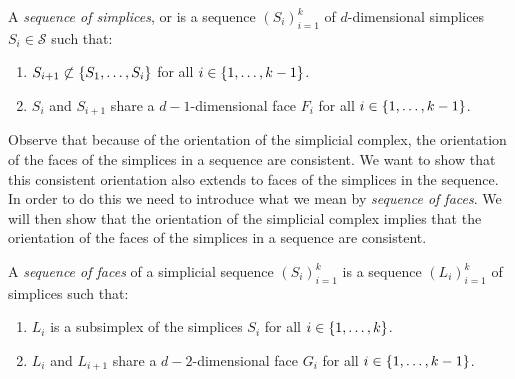 \begin{definition}
    \label{def:sequence_of_simplices}
    A \emph{sequence of simplices}, or  is a sequence $\left(S_i\right)_{i=1}^{k}$ of $d$-dimensional simplices $S_i \in \mathcal{S}$ such that:
    \begin{enumerate}
        \item $S_{i+1} \not\subset \left\{S_1, \dots, S_i\right\}$ for all $i \in \left\{1, \dots, k-1\right\}$.
        \item $S_i$ and $S_{i+1}$ share a $d-1$-dimensional face $F_i$ for all $i \in \left\{1, \dots, k-1\right\}$.
    \end{enumerate}
\end{definition}

Observe that because of the orientation of the simplicial complex, the orientation of the faces of the simplices in a sequence are consistent. We want to show that this consistent orientation also extends to faces of the simplices in the sequence. In order to do this we need to introduce what we mean by \textit{sequence of faces}. We will then show that the orientation of the simplicial complex implies that the orientation of the faces of the simplices in a sequence are consistent.

\begin{definition}
    \label{def:sequence_of_faces}
    A \emph{sequence of faces} of a simplicial sequence $\left(S_i\right)_{i=1}^{k}$  is a sequence $\left(L_i\right)_{i=1}^{k}$ of simplices such that:
    \begin{enumerate}
        \item {} $L_i$ is a subsimplex of the simplices $S_i$ for all $i \in \left\{1, \dots, k\right\}$.
        \item $L_i$ and $L_{i+1}$ share a $d-2$-dimensional face $G_i$ for all $i \in \left\{1, \dots, k-1\right\}$.
    \end{enumerate}
\end{definition}

